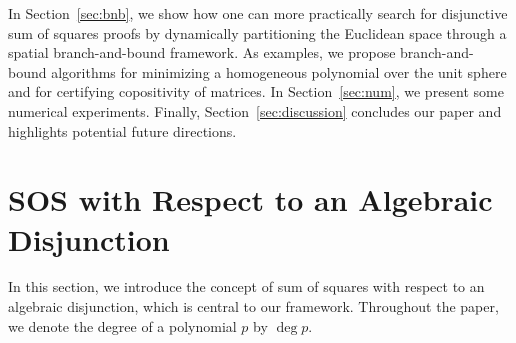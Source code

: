 \documentclass[12pt]{article}
\newcommand{\defeq}{\coloneq}
\theoremstyle{remark}
\begin{document}


In Section~\ref{sec:bnb}, we show how one can more practically search for disjunctive sum of squares proofs by dynamically partitioning the Euclidean space through a 
spatial branch-and-bound framework. As examples, 
%
we propose branch-and-bound algorithms for minimizing a homogeneous polynomial over the unit sphere and for certifying copositivity of matrices. In Section~\ref{sec:num}, we present some numerical experiments. 
Finally, Section~\ref{sec:discussion} concludes our paper and highlights potential future directions.



\section{SOS with Respect to an Algebraic Disjunction}\label{sec:disos}
In this section, we introduce the concept of sum of squares with respect to an algebraic disjunction, which is central to our framework. 
Throughout the paper, we denote the degree of a polynomial $p$ by $\deg p$.

\end{document}
